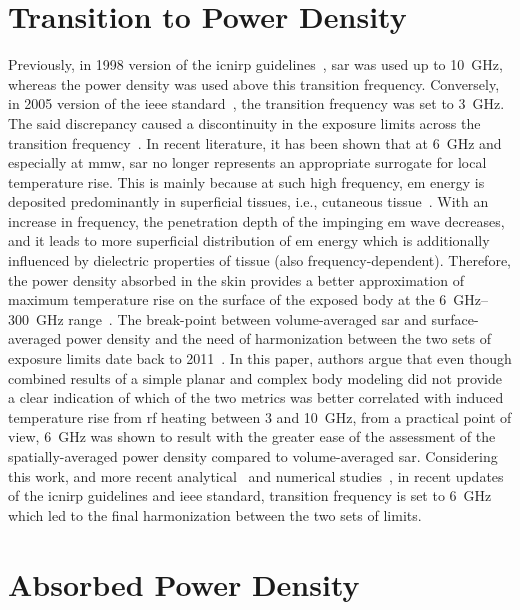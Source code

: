\section{Transition to Power Density}
Previously, in 1998 version of the \gls{icnirp} guidelines~\cite{ICNIRP1998Guidlines}, \gls{sar} was used up to \SI{10}{\GHz}, whereas the power density was used above this transition frequency.
Conversely, in 2005 version of the \gls{ieee} standard~\cite{IEEE2005Standard}, the transition frequency was set to \SI{3}{\GHz}.
The said discrepancy caused a discontinuity in the exposure limits across the transition frequency~\cite{Colombi2015}.
In recent literature, it has been shown that at \SI{6}{\GHz} and especially at \gls{mmw}, \gls{sar} no longer represents an appropriate surrogate for local temperature rise.
This is mainly because at such high frequency, \gls{em} energy is deposited predominantly in superficial tissues, i.e., cutaneous tissue~\cite{Ziskin2018Tissue,Zhadobov2011Millimeter}.
With an increase in frequency, the penetration depth of the impinging \gls{em} wave decreases, and it leads to more superficial distribution of \gls{em} energy which is additionally influenced by dielectric properties of tissue (also frequency-dependent).
Therefore, the power density absorbed in the skin provides a better approximation of maximum temperature rise on the surface of the exposed body at the \SIrange[range-units=single,range-phrase=--]{6}{300}{\GHz} range~\cite{Funahashi2018Area-Averaged}.
The break-point between volume-averaged \gls{sar} and surface-averaged power density and the need of harmonization between the two sets of exposure limits date back to 2011~\cite{McIntosh2011SAR}.
In this paper, authors argue that even though combined results of a simple planar and complex body modeling did not provide a clear indication of which of the two metrics was better correlated with induced temperature rise from \gls{rf} heating between \SI{3}{} and \SI{10}{\GHz}, from a practical point of view, \SI{6}{\GHz} was shown to result with the greater ease of the assessment of the spatially-averaged power density compared to volume-averaged \gls{sar}.
Considering this work, and more recent analytical~\cite{Foster2016Thermal,Foster2017Thermal,Ziskin2018Tissue} and numerical studies~\cite{Hirata2019Setting}, in recent updates of the \gls{icnirp} guidelines and \gls{ieee} standard, transition frequency is set to \SI{6}{\GHz} which led to the final harmonization between the two sets of limits.

\section{Absorbed Power Density}
